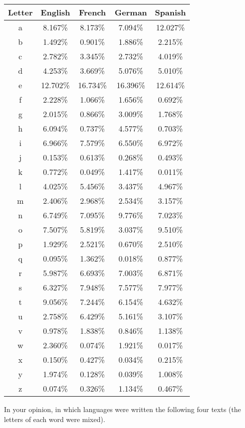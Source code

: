 \documentclass[11pt,class=report,crop=false]{standalone}
\begin{document}
\begin{activite}
\begin{enumerate}
\begin{center}
\begin{tabular}{|c||c|c|c|c|} 
\hline
Letter & English & French & German & Spanish \\ \hline\hline
a&8.167\%&8.173\%&7.094\%&12.027\% \\
b&1.492\%&0.901\%&1.886\%&2.215\% \\
c&2.782\%&3.345\%&2.732\%&4.019\% \\
d&4.253\%&3.669\%&5.076\%&5.010\% \\
e&12.702\%&16.734\%&16.396\%&12.614\% \\
f&2.228\%&1.066\%&1.656\%&0.692\% \\
g&2.015\%&0.866\%&3.009\%&1.768\% \\
h&6.094\%&0.737\%&4.577\%&0.703\% \\
i&6.966\%&7.579\%&6.550\%&6.972\% \\
j&0.153\%&0.613\%&0.268\%&0.493\% \\
k&0.772\%&0.049\%&1.417\%&0.011\% \\
l&4.025\%&5.456\%&3.437\%&4.967\% \\
m&2.406\%&2.968\%&2.534\%&3.157\% \\
n&6.749\%&7.095\%&9.776\%&7.023\% \\
o&7.507\%&5.819\%&3.037\%&9.510\% \\
p&1.929\%&2.521\%&0.670\%&2.510\% \\
q&0.095\%&1.362\%&0.018\%&0.877\% \\
r&5.987\%&6.693\%&7.003\%&6.871\% \\
s&6.327\%&7.948\%&7.577\%&7.977\% \\
t&9.056\%&7.244\%&6.154\%&4.632\% \\
u&2.758\%&6.429\%&5.161\%&3.107\% \\
v&0.978\%&1.838\%&0.846\%&1.138\% \\
w&2.360\%&0.074\%&1.921\%&0.017\% \\
x&0.150\%&0.427\%&0.034\%&0.215\% \\
y&1.974\%&0.128\%&0.039\%&1.008\% \\
z&0.074\%&0.326\%&1.134\%&0.467\% \\ 
\hline
\end{tabular} 
\end{center}

\bigskip

In your opinion, in which languages were written the following four texts (the letters of each word were mixed).


\end{enumerate}
\end{activite}
\end{document}
